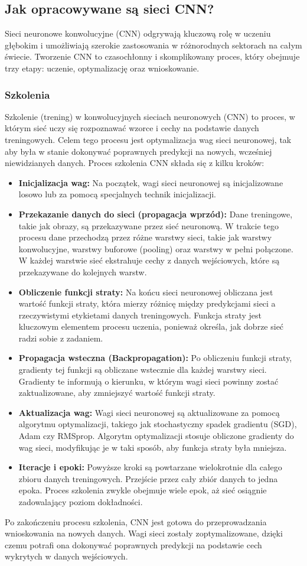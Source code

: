 \subsection{Jak opracowywane są sieci CNN?}
Sieci neuronowe konwolucyjne (CNN) odgrywają kluczową rolę w uczeniu głębokim i umożliwiają szerokie zastosowania w różnorodnych sektorach na całym świecie. Tworzenie CNN to czasochłonny i skomplikowany proces, który obejmuje trzy etapy: uczenie, optymalizację oraz wnioskowanie.
\subsubsection{Szkolenia}
Szkolenie (trening) w konwolucyjnych sieciach neuronowych (CNN) to proces, w którym sieć uczy się rozpoznawać wzorce i cechy na podstawie danych treningowych. Celem tego procesu jest optymalizacja wag sieci neuronowej, tak aby była w stanie dokonywać poprawnych predykcji na nowych, wcześniej niewidzianych danych. Proces szkolenia CNN składa się z kilku kroków:
\begin{itemize}
    \item \textbf{Inicjalizacja wag:} Na początek, wagi sieci neuronowej są inicjalizowane losowo lub za pomocą specjalnych technik inicjalizacji.
    \item \textbf{Przekazanie danych do sieci (propagacja wprzód):} Dane treningowe, takie jak obrazy, są przekazywane przez sieć neuronową. W trakcie tego procesu dane przechodzą przez różne warstwy sieci, takie jak warstwy konwolucyjne, warstwy buforowe (pooling) oraz warstwy w pełni połączone. W każdej warstwie sieć ekstrahuje cechy z danych wejściowych, które są przekazywane do kolejnych warstw.
    \item \textbf{Obliczenie funkcji straty:} Na końcu sieci neuronowej obliczana jest wartość funkcji straty, która mierzy różnicę między predykcjami sieci a rzeczywistymi etykietami danych treningowych. Funkcja straty jest kluczowym elementem procesu uczenia, ponieważ określa, jak dobrze sieć radzi sobie z zadaniem.
    \item \textbf{Propagacja wsteczna (Backpropagation): }Po obliczeniu funkcji straty, gradienty tej funkcji są obliczane wstecznie dla każdej warstwy sieci. Gradienty te informują o kierunku, w którym wagi sieci powinny zostać zaktualizowane, aby zmniejszyć wartość funkcji straty.
    \item \textbf{Aktualizacja wag:} Wagi sieci neuronowej są aktualizowane za pomocą algorytmu optymalizacji, takiego jak stochastyczny spadek gradientu (SGD), Adam czy RMSprop. Algorytm optymalizacji stosuje obliczone gradienty do wag sieci, modyfikując je w taki sposób, aby funkcja straty była mniejsza.
    \item \textbf{Iteracje i epoki: }Powyższe kroki są powtarzane wielokrotnie dla całego zbioru danych treningowych. Przejście przez cały zbiór danych to jedna epoka. Proces szkolenia zwykle obejmuje wiele epok, aż sieć osiągnie zadowalający poziom dokładności.
\end{itemize}
Po zakończeniu procesu szkolenia, CNN jest gotowa do przeprowadzania wnioskowania na nowych danych. Wagi sieci zostały zoptymalizowane, dzięki czemu potrafi ona dokonywać poprawnych predykcji na podstawie cech wykrytych w danych wejściowych.
